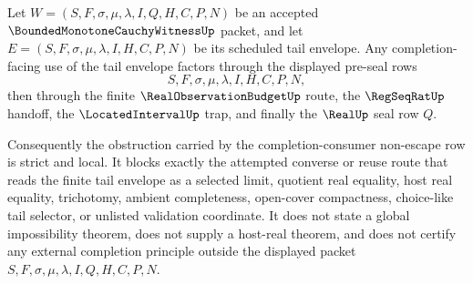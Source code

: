 \begin{corollary}
\label{cor:bounded-monotone-cauchy-witness-tail-envelope-strict-local-obstruction}
Let $W=(S,F,\sigma,\mu,\lambda,I,Q,H,C,P,N)$ be an accepted $\BoundedMonotoneCauchyWitnessUp$ packet, and let $E=(S,F,\sigma,\mu,\lambda,I,H,C,P,N)$ be its scheduled tail envelope. Any completion-facing use of the tail envelope factors through the displayed pre-seal rows
$$
S,F,\sigma,\mu,\lambda,I,H,C,P,N,
$$
then through the finite $\RealObservationBudgetUp$ route, the $\RegSeqRatUp$ handoff, the $\LocatedIntervalUp$ trap, and finally the $\RealUp$ seal row $Q$.

Consequently the obstruction carried by the completion-consumer non-escape row is strict and local. It blocks exactly the attempted converse or reuse route that reads the finite tail envelope as a selected limit, quotient real equality, host real equality, trichotomy, ambient completeness, open-cover compactness, choice-like tail selector, or unlisted validation coordinate. It does not state a global impossibility theorem, does not supply a host-real theorem, and does not certify any external completion principle outside the displayed packet $S,F,\sigma,\mu,\lambda,I,Q,H,C,P,N$.
\end{corollary}
